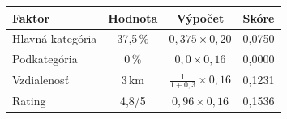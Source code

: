   \begin{table}[H]
  \centering                                                                                                                                                                                                                        
  \begin{tabular}{|l|c|c|c|}
  \hline                                                                                                                                                                                                                            
  \textbf{Faktor} & \textbf{Hodnota} & \textbf{Výpočet} & \textbf{Skóre} \\                                                                                                                                                         
  \hline                                                                                                                                                                                                                            
  Hlavná kategória & 37,5\,\% & $0{,}375 \times 0{,}20$ & 0,0750 \\                                                                                                                                                                 
  \hline                                                                                                                                                                                                                            
  Podkategória & 0\,\% & $0{,}0 \times 0{,}16$ & 0,0000 \\                                                                                                                                                                          
  \hline                                                                                                                                                                                                                            
  Vzdialenosť & 3\,km & $\frac{1}{1+0{,}3} \times 0{,}16$ & 0,1231 \\                                                                                                                                                               
  \hline                                                                                                                                                                                                                            
  Rating & 4,8/5 & $0{,}96 \times 0{,}16$ & 0,1536 \\                                                                                                                                                                               

\end{tabular}
\end{table}
